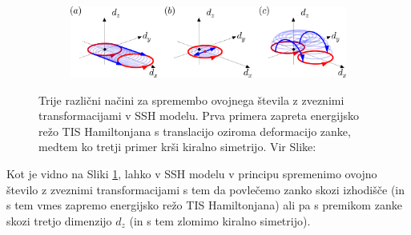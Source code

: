\begin{figure}[H]
\centering
\begin{subfigure}{.9\textwidth}
\includegraphics[width=\linewidth]{Figures/SymBreak.png}
\end{subfigure}
\caption{Trije različni načini za spremembo ovojnega števila z zveznimi transformacijami v SSH modelu. Prva primera zapreta energijsko režo TIS Hamiltonjana s translacijo oziroma deformacijo zanke, medtem ko tretji primer krši kiralno simetrijo. Vir Slike: \cite{madzar}}
\label{fig:symbreak}
\end{figure}

Kot je vidno na Sliki \ref{fig:symbreak}, lahko v SSH modelu v principu spremenimo ovojno število z zveznimi transformacijami s tem da povlečemo zanko skozi izhodišče (in s tem vmes zapremo energijsko režo TIS Hamiltonjana) ali pa s premikom zanke skozi tretjo dimenzijo $d_z$ (in s tem zlomimo kiralno simetrijo).

